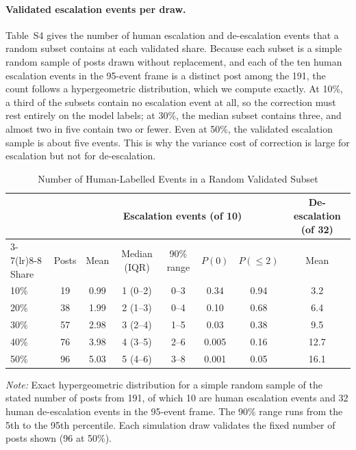 \documentclass[11pt]{article}
\begin{document}
\paragraph{Validated escalation events per draw.} Table~S4 gives the number of human escalation and de-escalation events that a random subset contains at each validated share. Because each subset is a simple random sample of posts drawn without replacement, and each of the ten human escalation events in the 95-event frame is a distinct post among the 191, the count follows a hypergeometric distribution, which we compute exactly. At 10\%, a third of the subsets contain no escalation event at all, so the correction must rest entirely on the model labels; at 30\%, the median subset contains three, and almost two in five contain two or fewer. Even at 50\%, the validated escalation sample is about five events. This is why the variance cost of correction is large for escalation but not for de-escalation.

\begin{table}[h]
\centering
\small
\caption{Number of Human-Labelled Events in a Random Validated Subset}
\label{tab:valcount}
\begin{tabular}{lccccccc}
\toprule
 & & \multicolumn{5}{c}{Escalation events (of 10)} & De-escalation (of 32) \\
\cmidrule(lr){3-7}\cmidrule(lr){8-8}
Share & Posts & Mean & Median (IQR) & 90\% range & $P(0)$ & $P(\leq 2)$ & Mean \\
\midrule
10\% & 19 & 0.99 & 1 (0--2) & 0--3 & 0.34 & 0.94 & 3.2 \\
20\% & 38 & 1.99 & 2 (1--3) & 0--4 & 0.10 & 0.68 & 6.4 \\
30\% & 57 & 2.98 & 3 (2--4) & 1--5 & 0.03 & 0.38 & 9.5 \\
40\% & 76 & 3.98 & 4 (3--5) & 2--6 & 0.005 & 0.16 & 12.7 \\
50\% & 96 & 5.03 & 5 (4--6) & 3--8 & 0.001 & 0.05 & 16.1 \\
\bottomrule
\end{tabular}

\vspace{0.5em}
\begin{minipage}{0.95\textwidth}
\footnotesize\textit{Note:} Exact hypergeometric distribution for a simple random sample of the stated number of posts from 191, of which 10 are human escalation events and 32 human de-escalation events in the 95-event frame. The 90\% range runs from the 5th to the 95th percentile. Each simulation draw validates the fixed number of posts shown (96 at 50\%).
\end{minipage}
\end{table}
\end{document}

